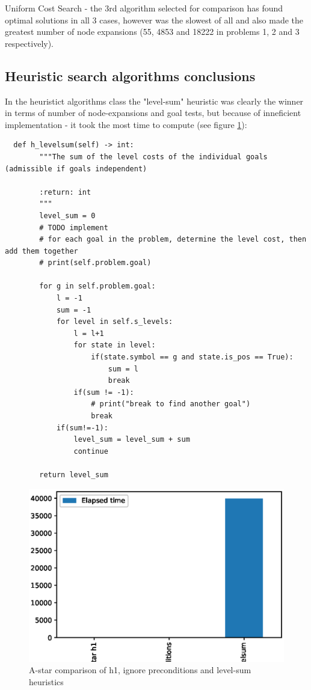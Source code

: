 \documentclass[12pt, a4paper]{article}
\begin{document}
Uniform Cost Search - the 3rd algorithm selected for comparison has found optimal solutions in all 3 cases, however was the slowest of all and also
made the greatest number of node expansions (55, 4853 and 18222 in problems 1, 2 and 3 respectively).


\subsection{Heuristic search algorithms conclusions}

In the heuristict algorithms class the "level-sum" heuristic was clearly the winner
in terms of number of node-expansions and goal tests, but because of inneficient
implementation - it took the most time to compute (see figure \ref{fig:astarp3}):

\begin{verbatim}
  def h_levelsum(self) -> int:
        """The sum of the level costs of the individual goals (admissible if goals independent)

        :return: int
        """
        level_sum = 0
        # TODO implement
        # for each goal in the problem, determine the level cost, then add them together
        # print(self.problem.goal)

        for g in self.problem.goal:
            l = -1
            sum = -1
            for level in self.s_levels:
                l = l+1
                for state in level:
                    if(state.symbol == g and state.is_pos == True):
                        sum = l
                        break
                if(sum != -1):
                    # print("break to find another goal")
                    break
            if(sum!=-1):
                level_sum = level_sum + sum
                continue

        return level_sum
\end{verbatim}

\begin{figure}[htbp]
  \includegraphics{astarp3.eps}
  \caption{A-star comparison of h1, ignore preconditions and level-sum heuristics}
  \label{fig:astarp3}
\end{figure}
\end{document}
